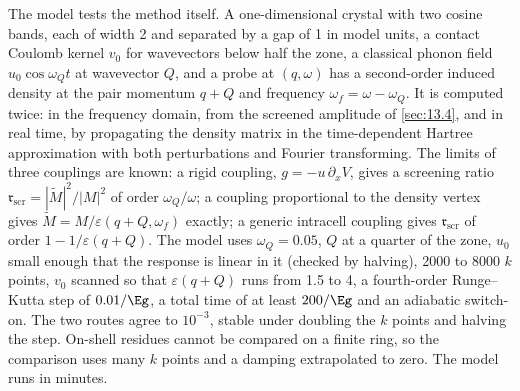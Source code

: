 The model tests the method itself. A one-dimensional crystal with two cosine bands, each of width 2 and separated by a gap of 1 in model units, a contact Coulomb kernel $v_0$ for wavevectors below half the zone, a classical phonon field $u_0\cos\omega_Qt$ at wavevector $Q$, and a probe at $(q,\omega)$ has a second-order induced density at the pair momentum $q+Q$ and frequency $\omega_f = \omega-\omega_Q$. It is computed twice: in the frequency domain, from the screened amplitude of \cref{sec:13.4}, and in real time, by propagating the density matrix in the time-dependent Hartree approximation with both perturbations and Fourier transforming. The limits of three couplings are known: a rigid coupling, $g = -u\,\partial_xV$, gives a screening ratio $\mathfrak{r}_{\mathrm{scr}} = |\tilde M|^2/|M|^2$ of order $\omega_Q/\omega$; a coupling proportional to the density vertex gives $\tilde M = M/\varepsilon(q+Q,\omega_f)$ exactly; a generic intracell coupling gives $\mathfrak{r}_{\mathrm{scr}}$ of order $1 - 1/\varepsilon(q+Q)$. The model uses $\omega_Q = 0.05$, $Q$ at a quarter of the zone, $u_0$ small enough that the response is linear in it (checked by halving), 2000 to 8000 $k$ points, $v_0$ scanned so that $\varepsilon(q+Q)$ runs from 1.5 to 4, a fourth-order Runge--Kutta step of $0.01/\Eg$, a total time of at least $200/\Eg$ and an adiabatic switch-on. The two routes agree to $10^{-3}$, stable under doubling the $k$ points and halving the step. On-shell residues cannot be compared on a finite ring, so the comparison uses many $k$ points and a damping extrapolated to zero. The model runs in minutes.

